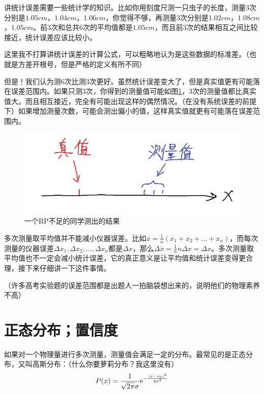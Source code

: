 讲统计误差需要一些统计学的知识。比如你用刻度尺测一只虫子的长度，测量$3$次分别是$1.05 \unit{cm}$，$1.04 \unit{cm}$，$1.06 \unit{cm}$，你觉得不够，再测量$3$次分别是$1.02 \unit{cm}$，$1.08 \unit{cm}$，$1.05 \unit{cm}$。前$3$次和总共$6$次的平均值都是$1.05 \unit{cm}$，而且前$3$次的结果相互之间比较接近，统计误差应该比较小。

这里我不打算讲统计误差的计算公式，可以粗略地认为是这些数据的标准差。（也就是方差开根号，但是严格的定义有所不同）

但是！我们认为测$6$次比测$3$次更好。虽然统计误差变大了，但是真实值更有可能落在误差范围内。如果只测$3$次，你得到的测量值可能如图\ref{fig-error-range}，$3$次的测量值都比真实值大。而且相互接近，完全有可能出现这样的偶然情况。（在没有系统误差的前提下）如果增加测量次数，可能会测出偏小的值，这样真实值就更有可能落在误差范围内。
\begin{figure}[htb]
\centering
\includegraphics[scale=0.5]{fig/error-range}
\caption{一个RP不足的同学测出的结果}
\label{fig-error-range}
\end{figure}

多次测量取平均值并不能减小仪器误差。比如$\overline{x}=\frac{1}{n}(x_1+x_2+\dots+x_n)$，而每次测量的仪器误差$\Delta x_1,\Delta x_2,\dots,\Delta x_n$都是$\Delta x$，那么$\Delta \overline{x}=\frac{1}{n} n \Delta x=\Delta x$。多次测量取平均值也不一定会减小统计误差，它的真正意义是让平均值和统计误差变得更合理，接下来仔细讲一下这件事情。

（许多高考实验题的误差范围都是出题人一拍脑袋想出来的，说明他们的物理素养不高）
\section{正态分布；置信度}
如果对一个物理量进行多次测量，测量值会满足一定的分布。最常见的是正态分布，又叫高斯分布：（什么你要萝莉分布？我这里没有）
\begin{equation*}
P(x)=\frac{1}{\sqrt{2 \pi} \sigma} \mathrm{e}^{-\frac{(x-x_0)^2}{2 \sigma^2}}
\end{equation*}

